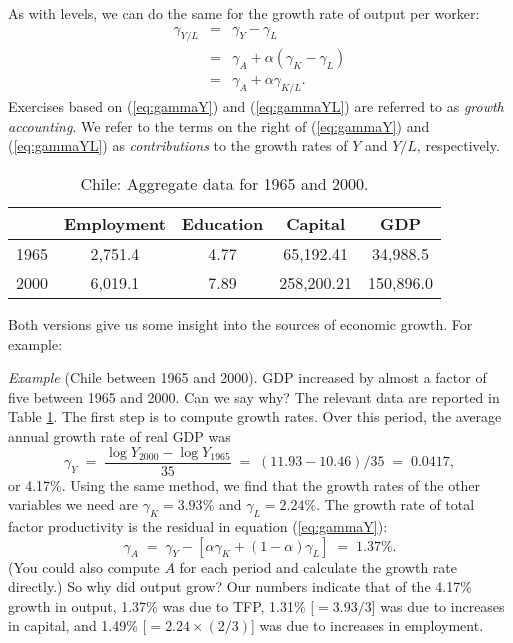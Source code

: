 \documentclass[letterpaper,12pt]{article}
\begin{document}
As with levels, we can do the same for the growth rate of output per worker:
\begin{eqnarray}
    \gamma_{Y/L} &=& \gamma_Y - \gamma_L \nonumber \\
            &=&  \gamma_A + \alpha (\gamma_K - \gamma_L) \nonumber \\
        &=& \gamma_A + \alpha \gamma_{K/L} .
    \label{eq:gammaYL}
\end{eqnarray}
Exercises based on (\ref{eq:gammaY}) and (\ref{eq:gammaYL}) are referred to as
{\it growth accounting\/}.
We refer to the terms on the right of (\ref{eq:gammaY})
and (\ref{eq:gammaYL})
as {\it contributions\/} to the growth rates of $Y$ and $Y/L$,
respectively.


\begin{table}[h]
\begin{center}
\begin{tabular}{lcccc}
\toprule
                &   Employment   & Education & Capital  & GDP \\%
\midrule 
1965            &     2,751.4    &    4.77   & 65,192.41  &  34,988.5 \\%
2000            &     6,019.1    &    7.89   & 258,200.21 & 150,896.0 \\%
\bottomrule 
\end{tabular}
\end{center}
\caption{Chile: Aggregate data for 1965 and 2000.}
\label{tab:chile}
\end{table}



Both versions give us some insight into the sources of economic
growth.  For example:

{\it Example\/} (Chile between 1965 and 2000).
GDP increased by almost a factor of five between 1965 and 2000.
Can we say why?
The relevant data are reported in Table \ref{tab:chile}.
The first step is to compute growth rates.
Over this period, the average annual growth rate of real GDP was
\[
    \gamma_{Y} \;=\; \frac{\log Y_{2000} -\log Y_{1965}}{35}
            \;=\; (11.93-10.46)/35 \;=\; 0.0417,
\]
or 4.17\%.
Using the same method,
we find that the growth rates of the other variables we need are
 $\gamma_{K}=3.93\%$ and $\gamma_{L}=2.24\%$.
The growth rate of total factor productivity is the residual
in equation (\ref{eq:gammaY}):
\[
    \gamma_A \;=\; \gamma_Y - \left[ \alpha \gamma_K +
            (1-\alpha) \gamma_L \right]
                \;=\; 1.37\% .
\]
(You could also compute $A$ for each period
and calculate the growth rate directly.)
So why did output grow?
Our numbers indicate that of the 4.17\% growth in output,
1.37\% was due to TFP, 1.31\% [$=3.93/3$] was due to increases in capital,
and 1.49\% [$=2.24 \times (2/3)$] was due to increases in employment.
\end{document}
